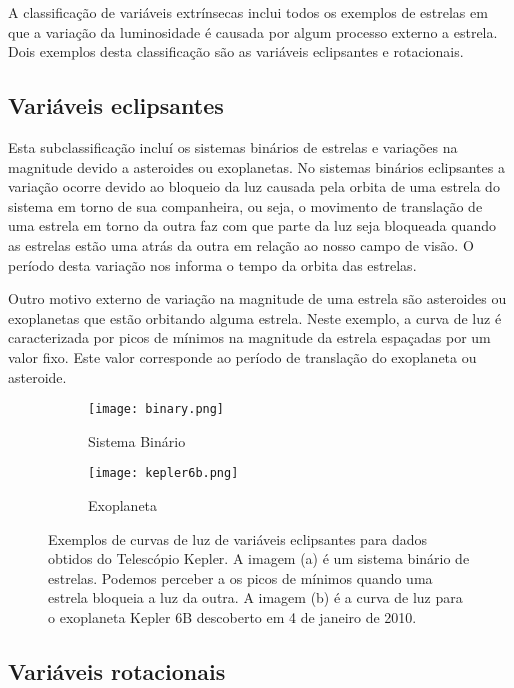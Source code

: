 A classificação de variáveis extrínsecas inclui todos os exemplos de estrelas em que a variação da luminosidade é causada por algum processo externo a estrela. Dois exemplos desta classificação são as variáveis eclipsantes e rotacionais.

\subsection{Variáveis eclipsantes}

Esta subclassificação incluí os sistemas binários de estrelas e variações na magnitude devido a asteroides ou exoplanetas. No sistemas binários eclipsantes a variação ocorre devido ao bloqueio da luz causada pela orbita de uma estrela do sistema em torno de sua companheira, ou seja, o movimento de translação de uma estrela em torno da outra faz com que parte da luz seja bloqueada quando as estrelas estão uma atrás da outra em relação ao nosso campo de visão. O período desta variação nos informa o tempo da orbita das estrelas.

Outro motivo externo de variação na magnitude de uma estrela são asteroides ou exoplanetas que estão orbitando alguma estrela. Neste exemplo, a curva de luz é caracterizada por picos de mínimos na magnitude da estrela espaçadas por um valor fixo. Este valor corresponde ao período de translação do exoplaneta ou asteroide.

\begin{figure}[!ht]
\centering
\begin{subfigure}{.5\textwidth}
  \centering
  \texttt{[image: binary.png]}
  \caption{Sistema Binário}
  \label{fig:binaria}
\end{subfigure}%
\begin{subfigure}{.5\textwidth}
  \centering
  \texttt{[image: kepler6b.png]}
  \caption{Exoplaneta}
  \label{fig:kepler6b}
\end{subfigure}
\caption[Curva de variáveis eclipsantes.]{Exemplos de curvas de luz de variáveis eclipsantes para dados obtidos do Telescópio Kepler. A imagem (a) é um sistema binário de estrelas. Podemos perceber a os picos de mínimos quando uma estrela bloqueia a luz da outra. A imagem (b) é a curva de luz para o exoplaneta Kepler 6B descoberto em 4 de janeiro de 2010.}
\label{fig:exemplo_eclipsantes}
\end{figure}


\subsection{Variáveis rotacionais}

